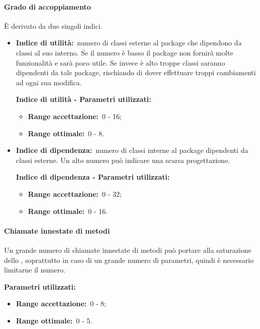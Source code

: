 			\paragraph{Grado di accoppiamento}
				\label{sec:3.9.3.5}
				È derivato da due singoli indici.
				\begin{itemize}
					\item \textbf{Indice di utilità:}\ numero di classi esterne al package che dipendono da classi al suo interno. Se il numero è basso il package non fornirà molte funzionalità e sarà poco utile. Se invece è alto troppe classi saranno dipendenti da tale package, rischiando di dover effettuare troppi cambiamenti ad ogni sua modifica.
					
					\textbf{Indice di utilità - Parametri utilizzati:}
					\begin{itemize}
						\item \textbf{Range accettazione:}\ 0 - 16;
						\item \textbf{Range ottimale:}\ 0 - 8.
					\end{itemize}
					\item \textbf{Indice di dipendenza:}\ numero di classi interne al package dipendenti da classi esterne. Un alto numero può indicare una scarsa progettazione.
					
					\textbf{Indice di dipendenza - Parametri utilizzati:}
					\begin{itemize}
						\item \textbf{Range accettazione:}\ 0 - 32;
						\item \textbf{Range ottimale:}\ 0 - 16.
					\end{itemize}
				\end{itemize}
			\paragraph{Chiamate innestate di metodi}
				\label{sec:3.9.3.6}
				Un grande numero di chiamate innestate di metodi può portare alla saturazione dello , soprattutto in caso di un grande numero di parametri, quindi è necessario limitarne il numero.
				
				\textbf{Parametri utilizzati:}
				\begin{itemize}
					\item \textbf{Range accettazione:}\ 0 - 8;
					\item \textbf{Range ottimale:}\ 0 - 5.
				\end{itemize}
